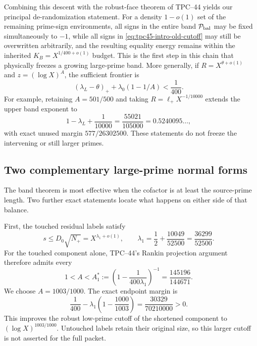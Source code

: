 Combining this descent with the robust-face theorem of TPC--44 yields
our principal de-randomization statement.  For a density
\(1-o(1)\) set of the remaining prime-sign environments, all signs in
the entire band \(\mathcal P_{\mathrm{bal}}\) may be fixed simultaneously to
\(-1\), while all signs in \eqref{eq:tpc45-intro-old-cutoff} may still
be overwritten arbitrarily, and the resulting equality energy remains
within the inherited \(K_B=X^{1/400+o(1)}\) budget.  This is the first
step in this chain that physically freezes a growing large-prime band.
More generally, if \(R=X^{\theta+o(1)}\) and
\(z=(\log X)^A\), the sufficient frontier is
\begin{equation}
 (\lambda_L-\theta)_+
 +\lambda_0(1-1/A)<\frac1{400}.
 \label{eq:tpc45-intro-tradeoff}
\end{equation}
For example, retaining \(A=501/500\) and taking
\(R=\ell_+X^{-1/10000}\) extends the upper band exponent to
\begin{equation}
 1-\lambda_L+\frac1{10000}
 =\frac{55021}{105000}=0.5240095\ldots,
 \label{eq:tpc45-intro-budgeted-endpoint}
\end{equation}
with exact unused margin \(577/26302500\).  These statements do not
freeze the intervening or still larger primes.

\subsection{Two complementary large-prime normal forms}

The band theorem is most effective when the cofactor is at least the
source-prime length.  Two further exact statements locate what happens
on either side of that balance.

First, the touched residual labels satisfy
\begin{equation}
 s\le D_0\sqrt{N_+}
 =X^{\lambda_1+o(1)},
 \qquad
 \lambda_1
 =\frac12+\frac{10049}{52500}
 =\frac{36299}{52500}.
 \label{eq:tpc45-intro-short-label}
\end{equation}
For the touched component alone, TPC--44's Rankin projection argument
therefore admits every
\begin{equation}
 1<A<
 A_1^*:=\left(1-\frac1{400\lambda_1}\right)^{-1}
 =\frac{145196}{144671}.
 \label{eq:tpc45-intro-A-star}
\end{equation}
We choose \(A=1003/1000\).  The exact endpoint margin is
\begin{equation}
 \frac1{400}-\lambda_1\left(1-\frac{1000}{1003}\right)
 =\frac{30329}{70210000}>0.
 \label{eq:tpc45-intro-new-gap}
\end{equation}
This improves the robust low-prime cutoff of the shortened component
to \((\log X)^{1003/1000}\).  Untouched labels retain their original
size, so this larger cutoff is not asserted for the full packet.

